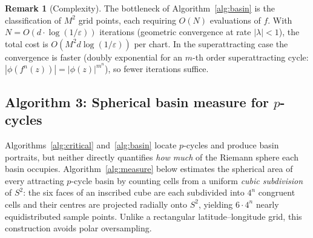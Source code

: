 \documentclass[12pt]{article}
\theoremstyle{definition}
\newtheorem{remark}[theorem]{Remark}
\begin{document}
\begin{remark}[Complexity]
The bottleneck of Algorithm~\ref{alg:basin} is the classification of
$M^2$ grid points, each requiring $O(N)$ evaluations of $f$.  With
$N=O(d\cdot\log(1/\varepsilon))$ iterations (geometric convergence at
rate $|\lambda|<1$), the total cost is $O(M^2 d\log(1/\varepsilon))$
per chart.  In the superattracting case the convergence is faster
(doubly exponential for an $m$-th order superattracting cycle:
$|\phi(f^n(z))| = |\phi(z)|^{m^n}$), so fewer iterations suffice.
\end{remark}



\subsection{Algorithm 3: Spherical basin measure for $p$-cycles}
\label{subsec:alg_measure}

Algorithms~\ref{alg:critical} and~\ref{alg:basin} locate $p$-cycles and
produce basin portraits, but neither directly quantifies \emph{how much} of
the Riemann sphere each basin occupies.  Algorithm~\ref{alg:measure} below
estimates the spherical area of every attracting $p$-cycle basin by counting
cells from a uniform \emph{cubic subdivision} of $S^2$: the six faces of an
inscribed cube are each subdivided into $4^n$ congruent cells and their
centres are projected radially onto $S^2$, yielding $6\cdot4^n$ nearly
equidistributed sample points.  Unlike a rectangular latitude--longitude grid,
this construction avoids polar oversampling.
\end{document}
